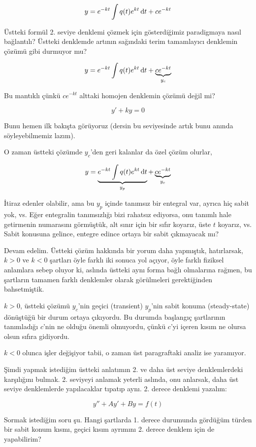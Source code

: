 \documentclass[12pt,fleqn]{article}\usepackage{../../common}
\begin{document}
$$ y = e^{-kt} \int q(t)e^{kt} \,\mathrm{d} t + ce^{-kt} $$

Üstteki formül 2. seviye denklemi çözmek için gösterdiğimiz paradigmaya nasıl
bağlantılı? Üstteki denklemde artının sağındaki terim tamamlayıcı denklemin
çözümü gibi durmuyor mu?

$$ y = e^{-kt} \int q(t)e^{kt} \,\mathrm{d} t + \underbrace{ce^{-kt}}_{y_c} $$

Bu mantıklı çünkü $ce^{-kt}$ alttaki homojen denklemin çözümü değil mi? 

$$ y' + ky = 0$$

Bunu hemen ilk bakışta görüyoruz (dersin bu seviyesinde artık bunu anında
söyleyebilmemiz lazım).

O zaman üstteki çözümde $y_c$'den geri kalanlar da özel çözüm olurlar, 

$$
y = \underbrace{e^{-kt} \int q(t)e^{kt} \,\mathrm{d} t}_{y_p} +
\underbrace{ce^{-kt}}_{y_c}
$$

İtiraz edenler olabilir, ama bu $y_p$ içinde tanımsız bir entegral var, ayrıca
hiç sabit yok, vs. Eğer entegralin tanımsızlığı bizi rahatsız ediyorsa, onu
tanımlı hale getirmenin numarasını görmüştük, alt sınır için bir sıfır koyarız,
üste $t$ koyarız, vs. Sabit konusuna gelince, entegre edince ortaya bir sabit
çıkmayacak mı?

Devam edelim. Üstteki çözüm hakkında bir yorum daha yapmıştık, hatırlarsak,
$k>0$ ve $k<0$ şartları öyle farklı iki sonuca yol açıyor, öyle farklı fiziksel
anlamlara sebep oluyor ki, aslında üstteki aynı forma bağlı olmalarına rağmen,
bu şartların tamamen farklı denklemler olarak görülmeleri gerektiğinden
bahsetmiştik.

$k>0$, üstteki çözümü $y_c$'nin geçici (transient) $y_p$'nin sabit konuma
(steady-state) dönüştüğü bir durum ortaya çıkıyordu. Bu durumda başlangıç
şartlarının tanımladığı $c$'nin ne olduğu önemli olmuyordu, çünkü $c$'yi içeren
kısım ne olursa olsun sıfıra gidiyordu.

$k<0$ olunca işler değişiyor tabii, o zaman üst paragraftaki analiz ise
yaramıyor. 

Şimdi yapmak istediğim üstteki anlatımın 2. ve daha üst seviye denklemlerdeki
karşılığını bulmak. 2. seviyeyi anlamak yeterli aslında, onu anlarsak, daha üst
seviye denklemlerde yapılacaklar tıpatıp aynı. 2. derece denklemi yazalım:

$$ y'' + Ay' + By = f(t) $$

Sormak istediğim soru şu. Hangi şartlarda 1. derece durumunda gördüğüm türden
bir sabit konum kısmı, geçici kısım ayrımını 2. derece denklem için de
yapabilirim?
\end{document}

